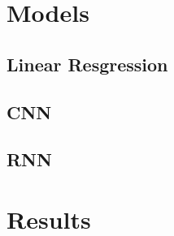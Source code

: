 \documentclass[runningheads,a4paper]{llncs}
\begin{document}
\section{Models}


\subsection{Linear Resgression}\label{sub:linReg}


\subsection{CNN}\label{sub:cnn}


\subsection{RNN}\label{sub:rnn}


\section{Results}\label{sec:results}



\begin{thebibliography}{4}


\end{thebibliography}
\end{document}
